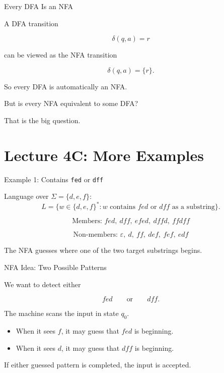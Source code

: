 \documentclass[10pt,aspectratio=169]{beamer}
\newcommand{\eps}{\varepsilon}
\begin{document}
\begin{frame}{Every DFA Is an NFA}

A DFA transition

\[
\delta(q,a)=r
\]

can be viewed as the NFA transition

\[
\delta(q,a)=\{r\}.
\]

\vspace{1em}

So every DFA is automatically an NFA.

\pause

\vspace{1em}

But is every NFA equivalent to some DFA?

That is the big question.

\end{frame}

\section{Lecture 4C: More Examples}

\begin{frame}{Example 1: Contains \texttt{fed} or \texttt{dff}}

Language over $\Sigma=\{d,e,f\}$:
\[
L=\{w\in\{d,e,f\}^*: w\text{ contains }fed\text{ or }dff\text{ as a substring}\}.
\]

\[
\text{Members: } fed,\ dff,\ efed,\ dffd,\ ffdff
\]

\[
\text{Non-members: } \eps,\ d,\ ff,\ def,\ fef,\ edf
\]

\vspace{0.5em}

\pause
The NFA guesses where one of the two target substrings begins.

\end{frame}

\begin{frame}{NFA Idea: Two Possible Patterns}

We want to detect either

\[
fed
\qquad\text{or}\qquad
dff.
\]

\vspace{0.7em}

The machine scans the input in state $q_0$.

\begin{itemize}
\item When it sees $f$, it may guess that $fed$ is beginning.
\item When it sees $d$, it may guess that $dff$ is beginning.
\end{itemize}

\vspace{0.7em}

\pause
If either guessed pattern is completed, the input is accepted.

\end{frame}
\end{document}
